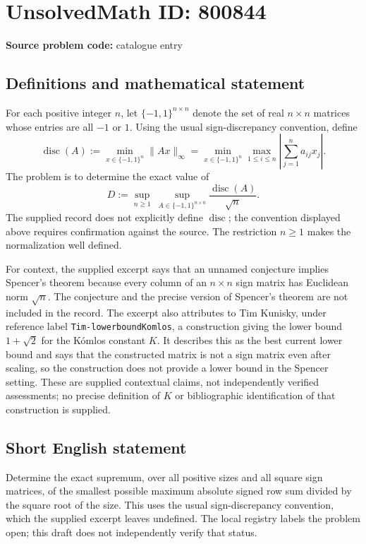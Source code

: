 \documentclass[11pt]{article}
\begin{document}
\section*{UnsolvedMath ID: 800844}
\textbf{Source problem code:} catalogue entry
\subsection{Definitions and mathematical statement}
For each positive integer \(n\), let \(\{-1,1\}^{n\times n}\) denote the set of real \(n\times n\) matrices whose entries are all \(-1\) or \(1\). Using the usual sign-discrepancy convention, define
\[
\operatorname{disc}(A):=\min_{x\in\{-1,1\}^{n}}\|Ax\|_{\infty}
=\min_{x\in\{-1,1\}^{n}}\max_{1\leq i\leq n}\left|\sum_{j=1}^{n}a_{ij}x_j\right|.
\]
The problem is to determine the exact value of
\[
D:=\sup_{n\geq 1}\ \sup_{A\in\{-1,1\}^{n\times n}}\frac{\operatorname{disc}(A)}{\sqrt n}.
\]
The supplied record does not explicitly define \(\operatorname{disc}\); the convention displayed above requires confirmation against the source. The restriction \(n\geq1\) makes the normalization well defined.

For context, the supplied excerpt says that an unnamed conjecture implies Spencer's theorem because every column of an \(n\times n\) sign matrix has Euclidean norm \(\sqrt n\). The conjecture and the precise version of Spencer's theorem are not included in the record. The excerpt also attributes to Tim Kunisky, under reference label \texttt{Tim-lowerboundKomlos}, a construction giving the lower bound \(1+\sqrt2\) for the K\'{o}mlos constant \(K\). It describes this as the best current lower bound and says that the constructed matrix is not a sign matrix even after scaling, so the construction does not provide a lower bound in the Spencer setting. These are supplied contextual claims, not independently verified assessments; no precise definition of \(K\) or bibliographic identification of that construction is supplied.
\subsection{Short English statement}
Determine the exact supremum, over all positive sizes and all square sign matrices, of the smallest possible maximum absolute signed row sum divided by the square root of the size. This uses the usual sign-discrepancy convention, which the supplied excerpt leaves undefined. The local registry labels the problem open; this draft does not independently verify that status.
\end{document}
